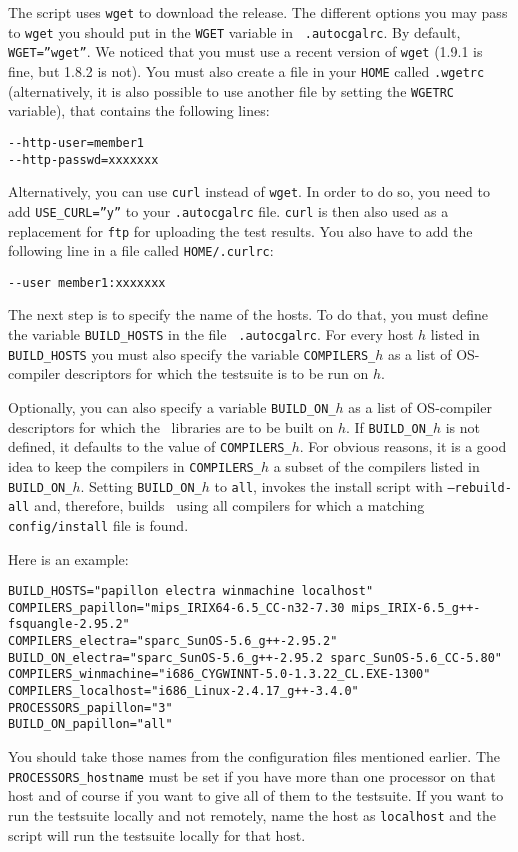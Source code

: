 The script uses {\tt wget} to download the release. The different options you
may pass to {\tt wget} you should put in the {\tt WGET} variable in {\tt
.autocgalrc}. By default, {\tt WGET=''wget''}. We noticed that you must use
a recent version of {\tt wget} (1.9.1 is fine, but 1.8.2 is not). You must
also create a file in your {\tt HOME} called {\tt .wgetrc} (alternatively,
it is also possible to use another file by setting the {\tt WGETRC} variable),
that contains the following lines:
\begin{verbatim}
--http-user=member1
--http-passwd=xxxxxxx
\end{verbatim}

Alternatively, you can use {\tt curl} instead of {\tt wget}.  In order to
do so, you need to add {\tt USE\_CURL=''y''} to your {\tt .autocgalrc} file.
{\tt curl} is then also used as a replacement for {\tt ftp} for uploading the
test results.
You also have to add the following line in a file called {\tt HOME/.curlrc}:
\begin{verbatim}
--user member1:xxxxxxx
\end{verbatim}

The next step is to specify the name of the hosts. To do that, you
must define the variable \texttt{BUILD\_HOSTS} in the file {\tt
  .autocgalrc}. For every host $h$ listed in \texttt{BUILD\_HOSTS} you
must also specify the variable \texttt{COMPILERS\_$h$} as a list of
OS-compiler descriptors for which the testsuite is to be run on $h$.

Optionally, you can also specify a variable \texttt{BUILD\_ON\_$h$} as
a list of OS-compiler descriptors for which the \cgal\ libraries are
to be built on $h$. If \texttt{BUILD\_ON\_$h$} is not defined, it
defaults to the value of \texttt{COMPILERS\_$h$}. For obvious reasons,
it is a good idea to keep the compilers in \texttt{COMPILERS\_$h$} a
subset of the compilers listed in \texttt{BUILD\_ON\_$h$}. Setting
\texttt{BUILD\_ON\_$h$} to \texttt{all}, invokes the install script
with \texttt{--rebuild-all} and, therefore, builds \cgal\ using all
compilers for which a matching \texttt{config/install} file is found.

\noindent Here is an example:
\begingroup\small
\begin{verbatim}
BUILD_HOSTS="papillon electra winmachine localhost"
COMPILERS_papillon="mips_IRIX64-6.5_CC-n32-7.30 mips_IRIX-6.5_g++-fsquangle-2.95.2"
COMPILERS_electra="sparc_SunOS-5.6_g++-2.95.2"
BUILD_ON_electra="sparc_SunOS-5.6_g++-2.95.2 sparc_SunOS-5.6_CC-5.80"
COMPILERS_winmachine="i686_CYGWINNT-5.0-1.3.22_CL.EXE-1300"
COMPILERS_localhost="i686_Linux-2.4.17_g++-3.4.0"
PROCESSORS_papillon="3" 
BUILD_ON_papillon="all"
\end{verbatim}\endgroup
You should take those names from the configuration files mentioned
earlier. The {\tt PROCESSORS\_hostname} must be set if you have more
than one processor on that host and of course if you want to give all
of them to the testsuite. If you want to run the testsuite locally and
not remotely, name the host as {\tt localhost} and the script will run
the testsuite locally for that host.

